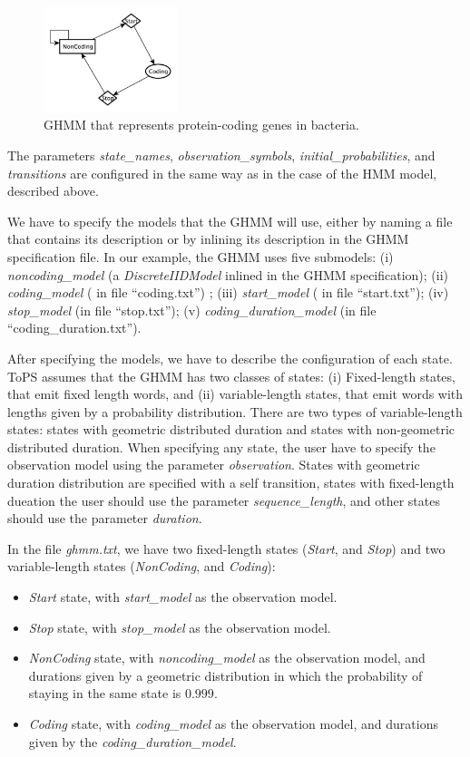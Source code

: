 \documentclass[10pt]{article}
\begin{document}
\begin{figure}[htpb]
  \centering
  \includegraphics[width=0.35\textwidth]{ghmm}
  \caption{GHMM that represents protein-coding genes in bacteria.}
  \label{fig:ghmm}
\end{figure}


The parameters \textit{state\_names}, \textit{observation\_symbols}, \textit{initial\_proba\-bilities}, and \textit{transi\-tions} are configured in the same way as in the case of  the HMM model, described above.

We have to specify the models that the GHMM will use, either by naming a file that contains its description or by inlining its description in the GHMM specification file. In our example, the GHMM uses five submodels: (i) \textit{noncoding\_model} (a \textit{DiscreteIIDModel} inlined in the GHMM specification); (ii) \textit{coding\_model} ( in file ``coding.txt'') ; (iii) \textit{start\_model} ( in file ``start.txt''); (iv) \textit{stop\_model} (in file ``stop.txt''); (v) \textit{coding\_duration\_model} (in file ``coding\_duration.txt'').

After specifying the models, we have to describe the configuration of each state. ToPS assumes that the GHMM has two classes of states: (i) Fixed-length  states, that  emit fixed length words, and  (ii) variable-length states, that emit words with lengths given by a probability distribution. There are two types of variable-length states:  states with geometric distributed duration and states with non-geometric distributed duration. When specifying any state, the user have to specify the observation model using the parameter \textit{observation}. States with geometric duration distribution are specified with a self transition, states with  fixed-length dueation the user should use the parameter \textit{sequence\_length}, and other states should use the  parameter \textit{duration}.

In the file \textit{ghmm.txt}, we have two fixed-length states (\textit{Start}, and \textit{Stop}) and two variable-length states (\textit{NonCoding}, and \textit{Coding}):
\begin{itemize}
  \item \textit{Start} state, with \textit{start\_model} as the observation model.
\item\textit{Stop} state, with \textit{stop\_model} as  the observation model. 
\item \textit{NonCoding} state, with   \textit{noncoding\_model} as the observation model, and durations  given by a geometric distribution in which the probability of staying in the same state is $0.999$. 
\item \textit{Coding} state,  with \textit{coding\_model} as the observation model, and durations  given by the \textit{coding\_duration\_model}.
\end{itemize}
\end{document}
